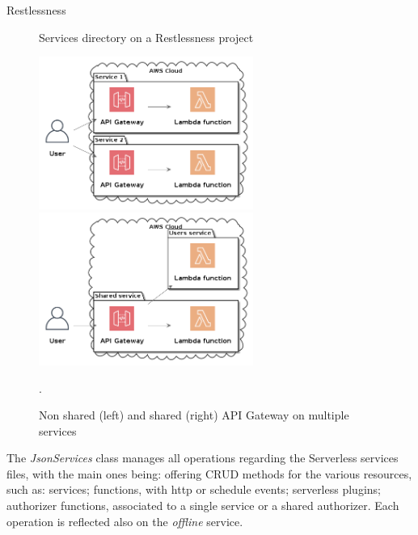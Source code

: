 \begin{chapter}{Restlessness}
    \begin{figure}
        \begin{minipage}{\linewidth}
        \end{minipage}
        \caption{Services directory on a Restlessness project}
        \label{fig:sls_services_dir}
    \end{figure}

    \begin{figure}
        \centering
        \includegraphics[width=7cm]{source/diagrams/multiple_api_gateway.png}
        \includegraphics[width=7cm]{source/diagrams/single_api_gateway.png}
        \caption{Non shared (left) and shared (right) API Gateway on multiple services}
        \label{fig:api_gateway_multiple_services}.
    \end{figure}

    The \textit{JsonServices} class manages all operations regarding the Serverless
    services files, with the main ones being: offering CRUD methods for the various
    resources, such as: services; functions, with http or schedule events;
    serverless plugins; authorizer functions, associated to a single service or a
    shared authorizer.
    Each operation is reflected also on the \textit{offline} service.


\end{chapter}
